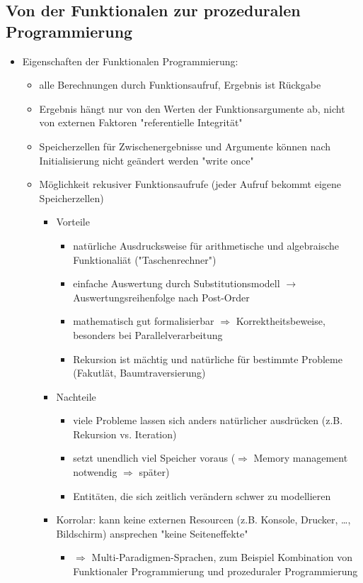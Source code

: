 \documentclass[a4paper]{scrartcl}
\begin{document}
\subsection{Von der Funktionalen zur prozeduralen Programmierung}
\label{sec-8-1}
\begin{itemize}
\item Eigenschaften der Funktionalen Programmierung:
\begin{itemize}
\item alle Berechnungen durch Funktionsaufruf, Ergebnis ist Rückgabe
\item Ergebnis hängt nur von den Werten der Funktionsargumente ab, nicht von externen Faktoren "referentielle Integrität"
\item Speicherzellen für Zwischenergebnisse und Argumente können nach Initialisierung nicht geändert werden "write once"
\item Möglichkeit rekusiver Funktionsaufrufe (jeder Aufruf bekommt eigene Speicherzellen)
\begin{itemize}
\item Vorteile
\begin{itemize}
\item natürliche Ausdrucksweise für arithmetische und algebraische Funktionaliät ("Taschenrechner")
\item einfache Auswertung durch Substitutionsmodell $\rightarrow$ Auswertungsreihenfolge nach Post-Order
\item mathematisch gut formalisierbar $\Rightarrow$ Korrektheitsbeweise, besonders bei Parallelverarbeitung
\item Rekursion ist mächtig und natürliche für bestimmte Probleme (Fakutlät, Baumtraversierung)
\end{itemize}
\item Nachteile
\begin{itemize}
\item viele Probleme lassen sich anders natürlicher ausdrücken (z.B. Rekursion vs. Iteration)
\item setzt unendlich viel Speicher voraus ($\Rightarrow$ Memory management notwendig $\Rightarrow$ später)
\item Entitäten, die sich zeitlich verändern schwer zu modellieren
\end{itemize}
\item Korrolar: kann keine externen Resourcen (z.B. Konsole, Drucker, \ldots, Bildschirm) ansprechen "keine Seiteneffekte"
\begin{itemize}
\item $\Rightarrow$ Multi-Paradigmen-Sprachen, zum Beispiel Kombination von Funktionaler Programmierung und prozeduraler Programmierung
\end{itemize}
\end{itemize}
\end{itemize}
\end{itemize}
\end{document}
